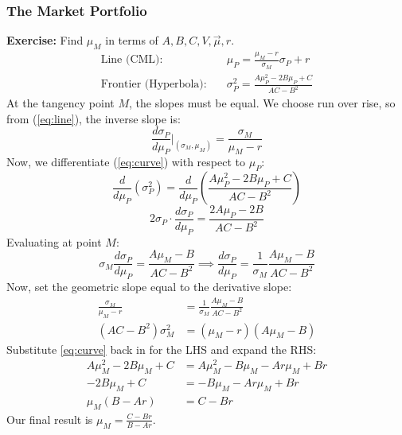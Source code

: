 \subsubsection{The Market Portfolio}
\textbf{Exercise: } Find \(\mu_M\) in terms of \(A, B, C, V, \vec{\mu}, r\).
\begin{align}
    \text{Line (CML):} \quad & \mu_P = \frac{\mu_M - r}{\sigma_M}\sigma_P + r \label{eq:line} \\
    \text{Frontier (Hyperbola):} \quad & \sigma_P^2 = \frac{A\mu_P^2 - 2B\mu_P + C}{AC - B^2} \label{eq:curve}
\end{align}
At the tangency point \(M\), the slopes must be equal. We choose run over rise, so from (\ref{eq:line}), the inverse slope is:
\[
\frac{d\sigma_P}{d\mu_P}\bigg|_{(\sigma_M, \mu_M)} = \frac{\sigma_M}{\mu_M - r}
\]
Now, we differentiate (\ref{eq:curve}) with respect to $\mu_P$:
\[
\frac{d}{d\mu_P}(\sigma_P^2) = \frac{d}{d\mu_P}\left( \frac{A\mu_P^2 - 2B\mu_P + C}{AC - B^2} \right)
\]
\[
2\sigma_P \cdot \frac{d\sigma_P}{d\mu_P} = \frac{2A\mu_P - 2B}{AC - B^2}
\]
Evaluating at point $M$:
\[
\sigma_M \frac{d\sigma_P}{d\mu_P} = \frac{A\mu_M - B}{AC - B^2} \implies \frac{d\sigma_P}{d\mu_P} = \frac{1}{\sigma_M} \frac{A\mu_M - B}{AC - B^2}
\]
Now, set the geometric slope equal to the derivative slope:
\begin{align*}
    \frac{\sigma_M}{\mu_M - r} &= \frac{1}{\sigma_M} \frac{A\mu_M - B}{AC - B^2} \\
    (AC - B^2)\sigma_M^2 &= (\mu_M - r)(A\mu_M - B)
\end{align*}
Substitute \ref{eq:curve} back in for the LHS and expand the RHS:
\begin{align*}
   A\mu_M^2 - 2B\mu_M + C &= A\mu_M^2 - B\mu_M - Ar\mu_M + Br \\
   -2B\mu_M + C &= - B\mu_M - Ar\mu_M + Br \\
   \mu_M(B - Ar) &= C - Br
\end{align*}
Our final result is \(\boxed{\mu_M = \frac{C - Br}{B - Ar}}\).

